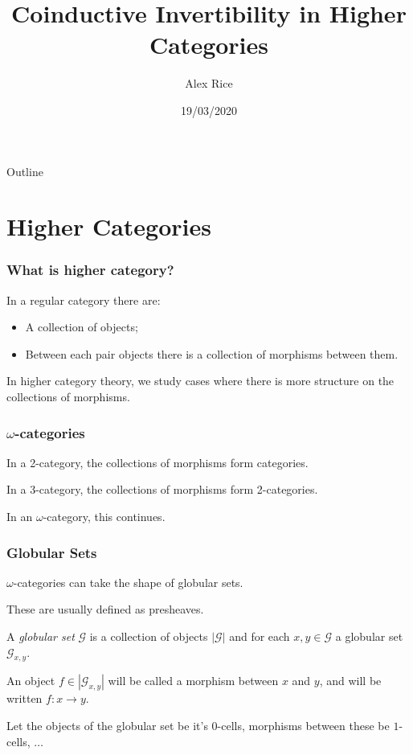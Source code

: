\documentclass[presentation]{beamer}
\author{Alex Rice}
\date{19/03/2020}
\title{Coinductive Invertibility in Higher Categories}
\begin{document}
\maketitle
\begin{frame}{Outline}
  \tableofcontents
\end{frame}

\section{Higher Categories}

\begin{frame}
  \frametitle{What is higher category?}
  In a regular category there are:
  \begin{itemize}
  \item A collection of objects;
  \item Between each pair objects there is a collection of morphisms between them.
  \end{itemize}
  \pause{}
  In higher category theory, we study cases where there is more structure on the collections of morphisms.
\end{frame}

\begin{frame}
  \frametitle{\(\omega\)-categories}
  In a 2-category, the collections of morphisms form categories.
  \pause{}

  In a 3-category, the collections of morphisms form 2-categories.
  \pause{}

  In an \(\omega\)-category, this continues.
\end{frame}

\begin{frame}
  \frametitle{Globular Sets}
  \(\omega\)-categories can take the shape of globular sets.
  \pause{}

  These are usually defined as presheaves.
  \pause{}
  \begin{definition}
    A \emph{globular set} \(\mathcal{G}\) is a collection of objects \(|\mathcal{G}|\) and for each \(x,y \in \mathcal{G}\) a globular set \(\mathcal{G}_{x,y}\).
  \end{definition}

  \pause{}
  An object \(f \in |\mathcal{G}_{x,y}|\) will be called a morphism between \(x\) and \(y\), and will be written \(f : x \to y\).

  \pause{}
  Let the objects of the globular set be it's \(0\)-cells, morphisms between these be \(1\)-cells, \(\dots\)

\end{frame}
\end{document}
